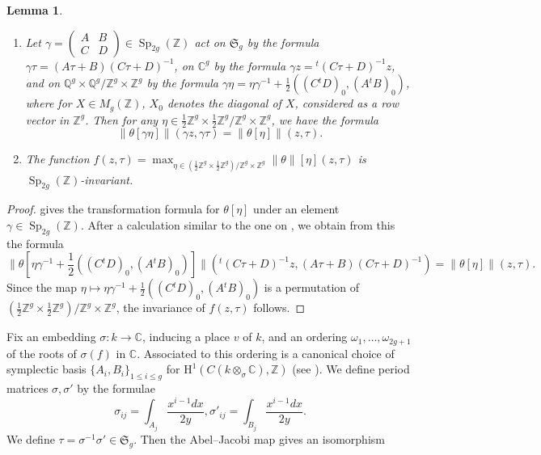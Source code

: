 \documentclass{article} %
\newtheorem{lemma}[proposition]{Lemma}
\numberwithin{equation}{section}
\DeclareMathOperator{\Sp}{Sp}
\newcommand{\HH}{\mathrm{H}}
\newcommand{\Q}{\mathbb{Q}}
\newcommand{\bC}{\mathbb{C}}
\newcommand{\Z}{\mathbb{Z}}
\begin{document}
\begin{lemma}\label{lem_sup_of_theta_functions}
\begin{enumerate}
    \item Let $\gamma = \left(\begin{smallmatrix} A & B \\ C & D \end{smallmatrix}\right) \in \Sp_{2g}(\Z)$ act on $\mathfrak{S}_g$ by the formula $\gamma \tau = (A \tau + B) (C \tau + D)^{-1}$, on $\bC^g$ by the formula $\gamma z = {}^t(C \tau + D)^{-1} z$, and on $\Q^g \times \Q^g / \Z^g \times \Z^g$ by the formula $\gamma \eta = \eta \gamma^{-1} + \frac{1}{2}( ( C {}^t D)_0, (A {}^t B)_0 )$, where for $X \in M_g(\Z)$, $X_0$ denotes the diagonal of $X$, considered as a row vector in $\Z^g$. Then for any $\eta \in \frac{1}{2} \Z^g \times \frac{1}{2} \Z^g / \Z^g \times \Z^g$, we have the formula
    \[ \| \theta[ \gamma \eta ] \|(\gamma z, \gamma \tau) = \| \theta[\eta] \|(z, \tau). \]
    \item The function $f(z, \tau) =  \max_{\eta \in (\frac{1}{2} \Z^g \times \frac{1}{2} \Z^g) / \Z^g \times \Z^g} \| \theta \|[\eta](z, \tau)$ is $\Sp_{2g}(\Z)$-invariant. 
\end{enumerate}
\end{lemma}
\begin{proof}
    \cite[Ch. II, Theorem 6, Corollary]{Igu72} gives the transformation formula for $\theta[\eta]$ under an element $\gamma  \in \Sp_{2g}(\Z)$. After a calculation similar to the one on \cite[p. 192]{MumfordTataI}, we obtain from this the formula
    \[ \| \theta[\eta \gamma^{-1} + \frac{1}{2} ((C {}^t D)_0, (A {}^t B)_0)]\| ({}^t(C \tau + D)^{-1} z, (A \tau + B)(C \tau + D)^{-1}) = \| \theta[\eta] \|(z, \tau).  \]
    Since the map $\eta \mapsto \eta \gamma^{-1} + \frac{1}{2} ((C {}^t D)_0, (A {}^t B)_0)$ is a permutation of $ (\frac{1}{2} \Z^g \times \frac{1}{2} \Z^g) / \Z^g \times \Z^g$, the invariance of $f(z, \tau)$ follows.
\end{proof}
Fix an embedding $\sigma : k \to \bC$, inducing a place $v$ of $k$, and an ordering $\omega_1, \dots, \omega_{2g+1}$ of the roots of $\sigma(f)$ in $\bC$. Associated to this ordering is a canonical choice of symplectic basis $\{ A_i, B_i \}_{1\leq i\leq g}$ for $\HH^1(C(k \otimes_\sigma \bC), \Z)$ (see \cite[Ch. IIIa, \S5]{MumfordTataII}). We define period matrices $\sigma, \sigma'$ by the formulae
\[ \sigma_{ij} = \int_{A_j} \frac{x^{i-1} dx}{2 y}, \sigma'_{ij} = \int_{B_j} \frac{x^{i-1} dx}{2y}. \]
We define $\tau = \sigma^{-1} \sigma' \in \mathfrak{S}_g$. Then the Abel--Jacobi map gives an isomorphism
\end{document}

